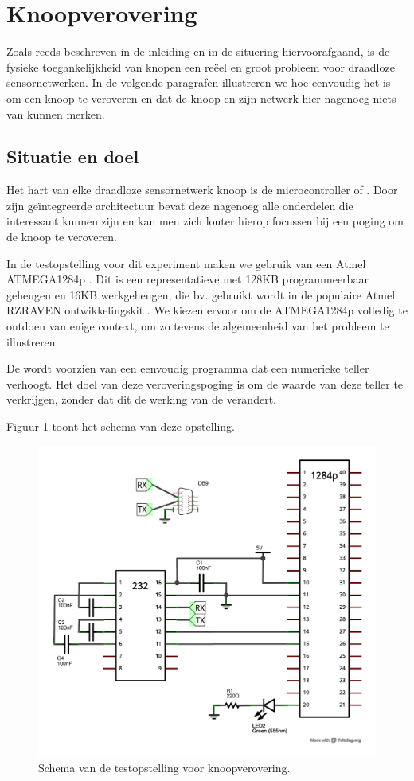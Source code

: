 
\section{Knoopverovering}
\label{section:node-capture}

Zoals reeds beschreven in de inleiding en in de situering hiervoorafgaand, is
de fysieke toegankelijkheid van knopen een re\"eel en groot probleem voor
draadloze sensornetwerken. In de volgende paragrafen illustreren we hoe
eenvoudig het is om een knoop te veroveren en dat de knoop en zijn netwerk hier
nagenoeg niets van kunnen merken.

\subsection{Situatie en doel}

Het hart van elke draadloze sensornetwerk knoop is de microcontroller of \mcu.
Door zijn ge\"integreerde architectuur bevat deze nagenoeg alle onderdelen die
interessant kunnen zijn en kan men zich louter hierop focussen bij een poging
om de knoop te veroveren.

In de testopstelling voor dit experiment maken we gebruik van een Atmel
ATMEGA1284p \citep{datasheet:atmega1284p}. Dit is een representatieve \mcu met
128KB programmeerbaar geheugen en 16KB werkgeheugen, die bv. gebruikt wordt in
de populaire Atmel RZRAVEN ontwikkelingskit \citep{manual:rzraven}. We kiezen
ervoor om de ATMEGA1284p volledig te ontdoen van enige context, om zo tevens de
algemeenheid van het probleem te illustreren.

De \mcu wordt voorzien van een eenvoudig programma dat een numerieke teller
verhoogt. Het doel van deze veroveringspoging is om de waarde van deze teller
te verkrijgen, zonder dat dit de werking van de \mcu verandert.

Figuur \ref{fig:node-capture-schematic} toont het schema van deze opstelling.

\begin{figure}[ht]
  \centering
  \includegraphics[width=0.7\linewidth]{resources/node-capture-schematic.pdf}
  \caption{Schema van de testopstelling voor knoopverovering.}
  \label{fig:node-capture-schematic}
\end{figure}

